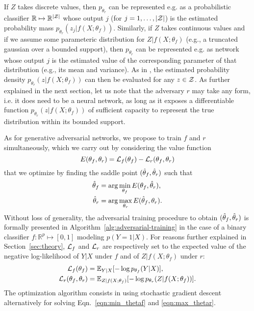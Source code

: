 \documentclass[twocolumn,superscriptaddress,aps]{revtex4-1}
\theoremstyle{plain}
\begin{document}
If $Z$ takes discrete values, then $p_{\theta_r}$ can be represented e.g. as a
probabilistic classifier $\mathbb{R} \mapsto \mathbb{R}^{|{\cal Z|}}$ whose
output $j$ (for $j=1, \dots, |{\cal Z}|$) is the estimated probability mass
$p_{\theta_r}(z_j|f(X;\theta_f))$. Similarly, if $Z$ takes continuous values and
if we assume some parameteric distribution for $Z|f(X;\theta_f)$ (e.g., a
truncated gaussian over a bounded support), then $p_{\theta_r}$ can be
represented e.g. as network whose output $j$ is the estimated value of the
corresponding parameter of that distribution (e.g., its mean and variance). As
in \citep{nix1994estimating}, the estimated probability density
$p_{\theta_r}(z|f(X;\theta_f))$ can then be evaluated for any $z \in {\cal Z}$.
As further explained in the next section, let us note that the adversary $r$ may
take any form, i.e. it does need to be a neural network, as long as it exposes a
differentiable function $p_{\theta_r}(z|f(X;\theta_f))$ of sufficient capacity
to represent the true distribution within its bounded support.

As for generative adversarial networks, we propose to
train $f$ and $r$ simultaneously, which we carry out by considering
the value function
\begin{equation}
    E(\theta_f, \theta_r) = {\cal L}_f(\theta_f) - {\cal L}_r(\theta_f, \theta_r)
\end{equation}
that we optimize by finding the saddle point $(\smash{\hat\theta_f}, \smash{\hat\theta_r})$ such that
\begin{align}
    \smash{\hat\theta_f} &= \arg \min_{\theta_f} E(\theta_f, \smash{\hat\theta_r}), \label{eqn:min_thetaf} \\
    \smash{\hat\theta_r} &= \arg \max_{\theta_r} E(\smash{\hat\theta_f}, \theta_r) \label{eqn:max_thetar}.
\end{align}
Without loss of generality, the adversarial training procedure to obtain
$(\smash{\hat\theta_f}, \smash{\hat\theta_r})$ is formally presented in
Algorithm~\ref{alg:adversarial-training} in the case of a binary classifier $f :
\mathbb{R}^p \mapsto [0,1]$ modeling $p(Y=1|X)$. For reasons further explained
in Section~\ref{sec:theory}, ${\cal L}_f$ and ${\cal L}_r$  are respectively set to the
expected value of the
negative log-likelihood of $Y|X$ under $f$ and of $Z|f(X;\theta_f)$ under
$r$:
\begin{align}
    {\cal L}_f(\theta_f) &= \mathbb{E}_{Y|X} [ -\log p_{\theta_f} (Y|X) ], \\
    {\cal L}_r(\theta_f, \theta_r) &= \mathbb{E}_{Z|f(X;\theta_f)} [-\log p_{\theta_r} (Z|f(X;\theta_f))].
\end{align}
The optimization algorithm consists in using stochastic gradient descent
alternatively for solving Eqn.~\ref{eqn:min_thetaf} and \ref{eqn:max_thetar}.
\end{document}
